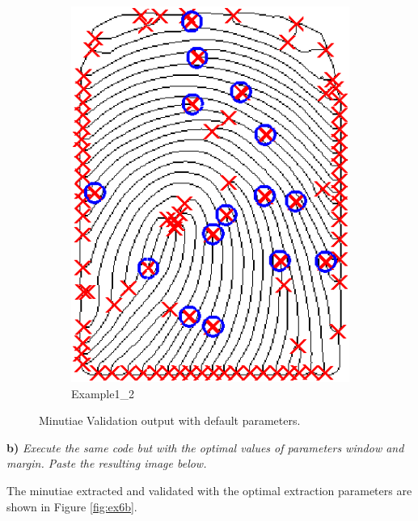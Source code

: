 \documentclass[11pt]{article}
\begin{document}
\begin{figure}[h!]
\begin{subfigure}[t]{0.45\textwidth}
         \includegraphics[scale=0.75]{img/ext_val_2}
         \caption{Example1\_2}
     \end{subfigure}
    \caption{Minutiae Validation output with default parameters.}
    \label{fig:ex6a}
\end{figure}

\textbf{b) }\emph{Execute the same code but with the optimal values of parameters window and margin. Paste the resulting image below.}

The minutiae extracted and validated with the optimal extraction parameters are shown in Figure \ref{fig:ex6b}.
\end{document}
